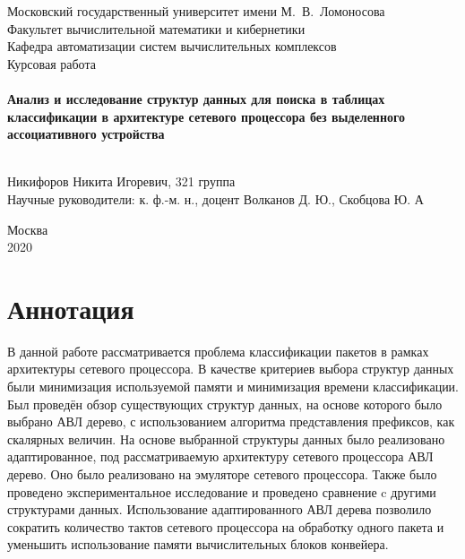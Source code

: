 \documentclass[a4peper, 12pt, titlepage, finall]{report}
\begin{document}
    \begin{titlepage}
        \begin{center}
            {\small \sc Московский государственный университет имени М.~В.~Ломоносова\\
            Факультет вычислительной математики и кибернетики\\
            Кафедра автоматизации систем вычислительных комплексов\\}
            \vfill
            {\large \sc Курсовая работа}\\~\\

            {\large \bf Анализ и исследование структур данных для поиска в таблицах классификации в архитектуре сетевого процессора без выделенного ассоциативного устройства}\\~\\

        \end{center}
        
        \begin{flushright}
            \vfill
            \vfill
            {Никифоров Никита Игоревич, 321 группа}\\
            {Научные руководители: к. ф.-м. н., доцент Волканов Д. Ю., Скобцова Ю. А}
        \end{flushright}

        \begin{center}
            \vfill
            {\small Москва\\2020}
        \end{center}
    \end{titlepage}

    \chapter*{Аннотация}
        В данной работе рассматривается проблема классификации пакетов в рамках архитектуры сетевого процессора. В качестве критериев выбора структур данных были минимизация 
        используемой памяти и минимизация времени классификации. Был проведён обзор существующих структур данных, на основе которого было выбрано АВЛ дерево,
        с использованием алгоритма представления префиксов, как скалярных величин. На основе выбранной структуры данных было реализовано
        адаптированное, под рассматриваемую архитектуру сетевого процессора АВЛ дерево. Оно было реализовано на эмуляторе сетевого процессора.
        Также было проведено экспериментальное исследование и проведено сравнение c другими структурами данных. Использование адаптированного АВЛ дерева позволило 
        сократить количество тактов сетевого процессора на обработку одного пакета и уменьшить использование памяти вычислительных блоков конвейера.
        
\end{document}

